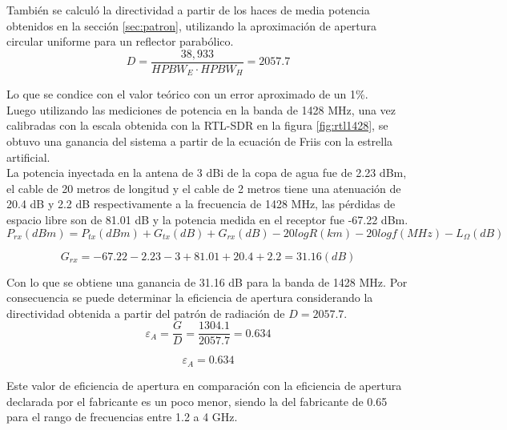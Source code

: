 También se calculó la directividad a partir de los haces de media potencia obtenidos en la sección \ref{sec:patron}, utilizando la aproximación de apertura circular uniforme para un reflector parabólico.\\

\begin{equation}
    D = \frac{38,933}{HPBW_{E}\cdot HPBW_{H}} = 2057.7
\end{equation}

Lo que se condice con el valor teórico con un error aproximado de un 1\%.\\

Luego utilizando las mediciones de potencia en la banda de 1428 MHz, una vez calibradas con la escala obtenida con la RTL-SDR en la figura \ref{fig:rtl1428}, se obtuvo una ganancia del sistema a partir de la ecuación de Friis con la estrella artificial.\\

La potencia inyectada en la antena de 3 dBi de la copa de agua fue de 2.23 dBm, el cable de 20 metros de longitud y el cable de 2 metros tiene una atenuación de 20.4 dB y 2.2 dB respectivamente a la frecuencia de 1428 MHz, las pérdidas de espacio libre son de 81.01 dB y la potencia medida en el receptor fue -67.22 dBm.\\

\begin{equation}
    P_{rx}(dBm) = P_{tx}(dBm) + G_{tx}(dB) + G_{rx}(dB) - 20log{R}(km) - 20log{f}(MHz) - L_{\Omega}(dB)
\end{equation}

\begin{equation}
    G_{rx} = -67.22 -2.23 - 3 + 81.01 + 20.4 + 2.2 = 31.16 (dB)
\end{equation}

Con lo que se obtiene una ganancia de 31.16 dB para la banda de 1428 MHz. Por consecuencia se puede determinar la eficiencia de apertura considerando la directividad obtenida a partir del patrón de radiación de $D=2057.7$.\\

\begin{equation}
    \varepsilon_{A} = \frac{G}{D} = \frac{1304.1}{2057.7} = 0.634
\end{equation}

\begin{equation}
    \varepsilon_{A} = 0.634
\end{equation}

Este valor de eficiencia de apertura en comparación con la eficiencia de apertura declarada por el fabricante es un poco menor, siendo la del fabricante de 0.65 para el rango de frecuencias entre 1.2 a 4 GHz.\\

